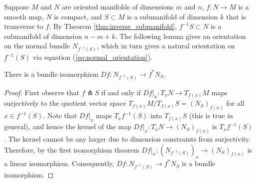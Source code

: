 Suppose $M$ and $N$ are oriented manifolds of dimensions $m$
and $n$, $f:N\to M$ is a smooth map, $N$ is compact, and
$S \subset M$ is a submanifold of dimension $k$ that is transverse to $f$. 
By Theorem \ref{thm:inverse_submanifold}, $f^{-1}S\subset N$ is a submanifold 
of dimension $n-m+k$. The following lemma gives an orientation on the normal
bundle $N_{f^{-1}(S)}$, which in turn gives a natural orientation on $f^{-1}(S)$
via equation (\ref{eq:normal_orientation}). 

\begin{lem} \label{lem:normal_isomorphism}
	There is a bundle isomorphism $Df : N_{f^{-1}(S)} \to f^*N_{S}$.
\end{lem}
\begin{proof}
	First observe that $f \pitchfork S$ if and only if  $Df|_x : T_x N \to
	T_{f(x)}M$ maps surjectively to the quotient vector space $T_{f(x)}M /T_{f(x)} S =
	(N_S)_{f(x)}$ for all $x\in f^{-1}(S)$. Note that $Df|_x$ maps
	$T_xf^{-1}(S)$ into $T_{f(x)}S$ (this is true in general), and hence
	the kernel of the map $Df|_x : T_x N \to (N_S)_{f(x)}$ is $T_xf^{-1}(S)$. 
	The kernel cannot be any larger due to dimension constraints from
	surjectivity. Therefore, by the first isomorphism theorem 
	$Df|_x : (N_{f^{-1}(S)})_x \to (N_S)_{f(x)}$ is a linear
	isomorphism. Consequently, 
	$Df : N_{f^{-1}(S)} \to f^*N_{S}$ is a bundle isomorphism. 
\end{proof}


